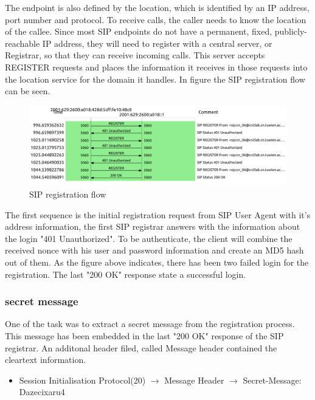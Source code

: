 \documentclass[parskip=full]{scrartcl}
\begin{document}
The endpoint is also defined by the location, which is identified by an IP address, port number and protocol. To receive calls, the caller needs to know the location of the callee. Since most SIP endpoints do not have a permanent, fixed, publicly-reachable IP address, they will need to register with a central server, or Registrar, so that they can receive incoming calls. This server accepts REGISTER requests and places the information it receives in those requests into the location service for the domain it handles. In figure  the SIP registration flow can be seen. 

\begin{figure}[!ht]
	\centering %
	\includegraphics[width=\textwidth]{images/FlowSeqReg.pdf} %
	\caption{SIP registration flow} 
	\label{fig:SIP Registrar} %
\end{figure}

The first sequence is the initial registration request from SIP User Agent with it's address information, the first SIP registrar answers with the information about the login "401 Unauthorized". To be authenticate, the client will combine the received nonce with his user and password information and create an MD5 hash out of them. As the figure above indicates, there has been two failed login for the registration. The last "200 OK" response state a successful login.

\subsubsection{secret message}
One of the task was to extract a secret message from the registration process. This message has been embedded in the last "200 OK" response of the SIP registrar. An additonal header filed, called Message header contained the cleartext information.

\begin{itemize}
	\item Session Initialisation Protocol(20) $\to$ Message Header $\to$ Secret-Message: Dazecixaru4
\end{itemize}
\end{document}
